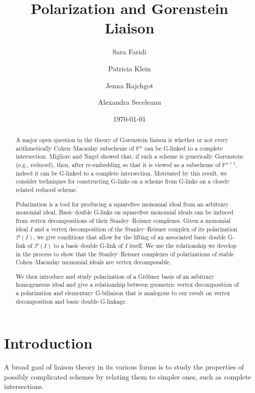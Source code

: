 \documentclass[12pt, reqno]{amsart}
\title[Polarization and Gorenstein Liaison]{Polarization and Gorenstein Liaison}
\author[Faridi]{Sara Faridi}
\author[Klein]{Patricia Klein}
\author[Rajchgot]{Jenna Rajchgot}
\author[Seceleanu]{Alexandra Seceleanu}
\date{\today}
\numberwithin{equation}{section}
\newtheorem{Main Conjecture}[theorem]{Main Conjecture}
\theoremstyle{definition}
\theoremstyle{plain}
\newcommand{\PP}{\mathbb{P}}
\renewcommand{\P}{\mathcal{P}}
\begin{document}
\begin{abstract}
A major open question in the theory of Gorenstein liaison is whether or not every arithmetically Cohen--Macaulay subscheme of $\PP^n$ can be G-linked to a complete intersection.  Migliore and Nagel showed that, if such a scheme is generically Gorenstein (e.g., reduced), then, after re-embedding so that it is viewed as a subscheme of $\PP^{n+1}$, indeed it can be G-linked to a complete intersection. Motivated by this result, we consider techniques for constructing G-links on a scheme from G-links on a closely related reduced scheme. 

Polarization is a tool for producing a squarefree monomial ideal from an arbitrary monomial ideal.  Basic double G-links on squarefree monomial ideals can be induced from vertex decompositions of their Stanley--Reisner complexes.  Given a monomial ideal $I$ and a vertex decomposition of the Stanley--Reisner complex of its polarization $\P(I)$, we give conditions that allow for the lifting of an associated basic double G-link of $\P(I)$ to a basic double G-link of $I$ itself. We use the relationship we develop in the process to show that the Stanley--Reisner complexes of polarizations of stable Cohen--Macaulay monomial ideals are vertex decomposable.

We then introduce and study polarization of a Gr\"obner basis of an arbitrary homogeneous ideal and give a relationship between geometric vertex decomposition of a polarization and elementary G-biliaison that is analogous to our result on vertex decomposition and basic double G-linkage.
\end{abstract}
\maketitle

\setcounter{tocdepth}{1} %
\tableofcontents



\section{Introduction}
\label{sec:intro}

A broad goal of  liaison theory in its various forms is to study the properties of possibly complicated schemes by relating them to simpler ones, such as complete intersections.  
\end{document}
